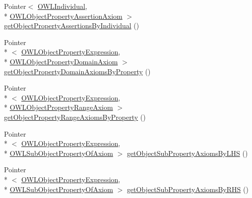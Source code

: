 \begin{DoxyCompactItemize}
\item 
Pointer$<$ \hyperlink{interfaceorg_1_1semanticweb_1_1owlapi_1_1model_1_1_o_w_l_individual}{O\-W\-L\-Individual}, \\*
\hyperlink{interfaceorg_1_1semanticweb_1_1owlapi_1_1model_1_1_o_w_l_object_property_assertion_axiom}{O\-W\-L\-Object\-Property\-Assertion\-Axiom} $>$ \hyperlink{interfaceuk_1_1ac_1_1manchester_1_1cs_1_1owl_1_1owlapi_1_1_internals_a4cf4b1438db8a444f81aac7f3e2e4340}{get\-Object\-Property\-Assertions\-By\-Individual} ()
\item 
Pointer\\*
$<$ \hyperlink{interfaceorg_1_1semanticweb_1_1owlapi_1_1model_1_1_o_w_l_object_property_expression}{O\-W\-L\-Object\-Property\-Expression}, \\*
\hyperlink{interfaceorg_1_1semanticweb_1_1owlapi_1_1model_1_1_o_w_l_object_property_domain_axiom}{O\-W\-L\-Object\-Property\-Domain\-Axiom} $>$ \hyperlink{interfaceuk_1_1ac_1_1manchester_1_1cs_1_1owl_1_1owlapi_1_1_internals_a12d37b412d154a5e948cadd7e992b617}{get\-Object\-Property\-Domain\-Axioms\-By\-Property} ()
\item 
Pointer\\*
$<$ \hyperlink{interfaceorg_1_1semanticweb_1_1owlapi_1_1model_1_1_o_w_l_object_property_expression}{O\-W\-L\-Object\-Property\-Expression}, \\*
\hyperlink{interfaceorg_1_1semanticweb_1_1owlapi_1_1model_1_1_o_w_l_object_property_range_axiom}{O\-W\-L\-Object\-Property\-Range\-Axiom} $>$ \hyperlink{interfaceuk_1_1ac_1_1manchester_1_1cs_1_1owl_1_1owlapi_1_1_internals_a539904f59c359880a4afbca4750f549f}{get\-Object\-Property\-Range\-Axioms\-By\-Property} ()
\item 
Pointer\\*
$<$ \hyperlink{interfaceorg_1_1semanticweb_1_1owlapi_1_1model_1_1_o_w_l_object_property_expression}{O\-W\-L\-Object\-Property\-Expression}, \\*
\hyperlink{interfaceorg_1_1semanticweb_1_1owlapi_1_1model_1_1_o_w_l_sub_object_property_of_axiom}{O\-W\-L\-Sub\-Object\-Property\-Of\-Axiom} $>$ \hyperlink{interfaceuk_1_1ac_1_1manchester_1_1cs_1_1owl_1_1owlapi_1_1_internals_a0efe7250d24ec943f8258d2b4dbe9ea2}{get\-Object\-Sub\-Property\-Axioms\-By\-L\-H\-S} ()
\item 
Pointer\\*
$<$ \hyperlink{interfaceorg_1_1semanticweb_1_1owlapi_1_1model_1_1_o_w_l_object_property_expression}{O\-W\-L\-Object\-Property\-Expression}, \\*
\hyperlink{interfaceorg_1_1semanticweb_1_1owlapi_1_1model_1_1_o_w_l_sub_object_property_of_axiom}{O\-W\-L\-Sub\-Object\-Property\-Of\-Axiom} $>$ \hyperlink{interfaceuk_1_1ac_1_1manchester_1_1cs_1_1owl_1_1owlapi_1_1_internals_a12df533a393475c9a729e3f5eb8fd483}{get\-Object\-Sub\-Property\-Axioms\-By\-R\-H\-S} ()

\end{DoxyCompactItemize}
